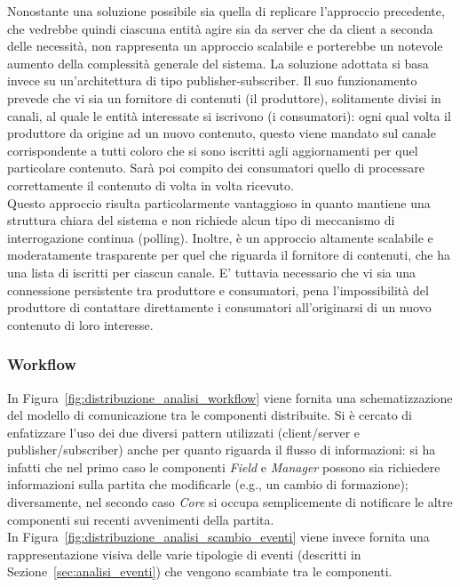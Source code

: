 Nonostante una soluzione possibile sia quella di replicare l'approccio precedente, che vedrebbe quindi ciascuna entità agire sia da server che da client a seconda delle necessità, non rappresenta un approccio scalabile e porterebbe un notevole aumento della complessità generale del sistema. La soluzione adottata si basa invece su un'architettura di tipo publisher-subscriber. Il suo funzionamento prevede che vi sia un fornitore di contenuti (il produttore), solitamente divisi in canali, al quale le entità interessate si iscrivono (i consumatori): ogni qual volta il produttore da origine ad un nuovo contenuto, questo viene mandato sul canale corrispondente a tutti coloro che si sono iscritti agli aggiornamenti per quel particolare contenuto. Sarà poi compito dei consumatori quello di processare correttamente il contenuto di volta in volta ricevuto.\\

Questo approccio risulta particolarmente vantaggioso in quanto mantiene una struttura chiara del sistema e non richiede alcun tipo di meccanismo di interrogazione continua (polling). Inoltre, è un approccio altamente scalabile e moderatamente trasparente per quel che riguarda il fornitore di contenuti, che ha una lista di iscritti per ciascun canale. E' tuttavia necessario che vi sia una connessione persistente tra produttore e consumatori, pena l'impossibilità del produttore di contattare direttamente i consumatori all'originarsi di un nuovo contenuto di loro interesse.

\subsubsection{Workflow}
\label{sec:analisi_workflow}

In Figura~\ref{fig:distribuzione_analisi_workflow} viene fornita una schematizzazione del modello di comunicazione tra le componenti distribuite. Si è cercato di enfatizzare l'uso dei due diversi pattern utilizzati (client/server e publisher/subscriber) anche per quanto riguarda il flusso di informazioni: si ha infatti che nel primo caso le componenti \emph{Field} e \emph{Manager} possono sia richiedere informazioni sulla partita che modificarle (e.g., un cambio di formazione); diversamente, nel secondo caso \emph{Core} si occupa semplicemente di notificare le altre componenti sui recenti avvenimenti della partita.\\

In Figura~\ref{fig:distribuzione_analisi_scambio_eventi} viene invece fornita una rappresentazione visiva delle varie tipologie di eventi (descritti in Sezione~\ref{sec:analisi_eventi}) che vengono scambiate tra le componenti.

